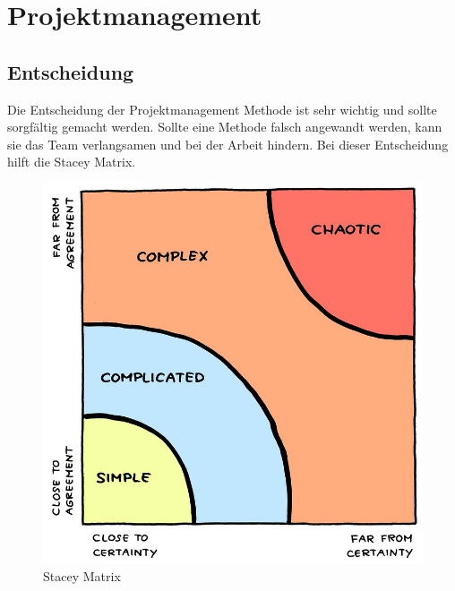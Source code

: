 \chapter{Projektmanagement}
\section{Entscheidung}
Die Entscheidung der Projektmanagement Methode ist sehr wichtig und sollte sorgfältig gemacht werden. Sollte eine Methode falsch angewandt werden, kann sie das Team verlangsamen und bei der Arbeit hindern. Bei dieser Entscheidung hilft die Stacey Matrix.

\begin{figure}
  \includegraphics[width=0.9\linewidth]{./images/stacey_matrix}
  \caption[\href{https://blog.ordix.de/welches-vorgehen-eignet-sich-fuer-mein-projekt}{Stacey Matrix Grafik von Jurgen Appello.}]{Stacey Matrix}
  \label{fig:stacey}
\end{figure}\leavevmode

